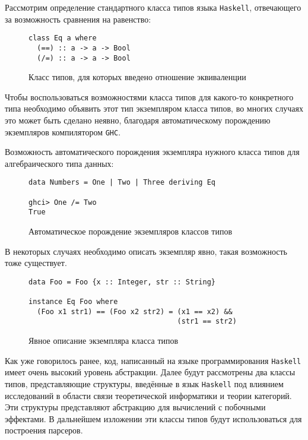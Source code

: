 Рассмотрим определение стандартного класса типов языка \lstinline{Haskell}, 
отвечающего за возможность сравнения на равенство:

\begin{figure}[h]
\begin{lstlisting}
class Eq a where
  (==) :: a -> a -> Bool
  (/=) :: a -> a -> Bool
\end{lstlisting}
\caption{Класс типов, для которых введено отношение эквиваленции}
\label{listing:Eq}
\end{figure}

Чтобы воспользоваться возможностями класса типов для какого-то конкретного типа 
необходимо объявить этот тип экземпляром класса типов, во многих случаях это 
может быть сделано неявно, благодаря автоматическому порождению экземпляров 
компилятором \lstinline{GHC}.

Возможность автоматического порождения экземпляра нужного класса типов для 
алгебраического типа данных:
\begin{figure}[h]
\begin{lstlisting}
data Numbers = One | Two | Three deriving Eq

ghci> One /= Two
True
\end{lstlisting}
\caption{Автоматическое порождение экземпляров классов типов}
\label{listing:List}
\end{figure}


В некоторых случаях необходимо описать экземпляр явно, такая возможность тоже 
существует.

\begin{figure}[h]
\begin{lstlisting}
data Foo = Foo {x :: Integer, str :: String}

instance Eq Foo where
  (Foo x1 str1) == (Foo x2 str2) = (x1 == x2) &&
                                   (str1 == str2)
\end{lstlisting}
\caption{Явное описание экземпляра класса типов}
\label{listing:Instance}
\end{figure}

Как уже говорилось ранее, код, написанный на языке программирования 
\lstinline{Haskell} имеет очень высокий уровень абстракции. Далее будут 
рассмотрены два классы типов, представляющие структуры, введённые в язык 
\lstinline{Haskell} под влиянием исследований в области связи теоретической 
информатики и теории категорий. Эти структуры представляют абстракцию для 
вычислений с побочными эффектами. В дальнейшем изложении эти классы типов будут
использоваться для построения парсеров.

